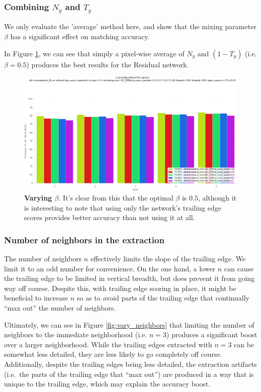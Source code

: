 \subsubsection{Combining $N_y$ and $T_y$}

We only evaluate the 'average' method here, and show that the mixing parameter $\beta$ has a significant effect on matching accuracy.

In Figure \ref{fig:vary_te_weight}, we can see that simply a pixel-wise average of $N_y$ and $(1-T_y)$ (i.e. $\beta = 0.5$) produces the best results for the Residual network.

\begin{figure}[t]%
\centering
\includegraphics[width=1\textwidth]{../images/results/vary_te_weight.png}
\caption{\textbf{Varying $\beta$}. It's clear from this that the optimal $\beta$ is $0.5$, although it is interesting to note that using only the network's trailing edge scores provides better accuracy than not using it at all.}
\label{fig:vary_te_weight}
\end{figure}


\subsubsection{Number of neighbors in the extraction}

The number of neighbors $n$ effectively limits the slope of the trailing edge.
We limit it to an odd number for convenience.
On the one hand, a lower $n$ can cause the trailing edge to be limited in vertical breadth, but does prevent it from going way off course.
Despite this, with trailing edge scoring in place, it might be beneficial to increase $n$ so as to avoid parts of the trailing edge that continually ``max out'' the number of neighbors.

Ultimately, we can see in Figure \ref{fig:vary_neighbors} that limiting the number of neighbors to the immediate neighborhood (i.e. $n = 3$) produces a significant boost over a larger neighborhood.
While the trailing edges extracted with $n = 3$ can be somewhat less detailed, they are less likely to go completely off course.
Additionally, despite the trailing edges being less detailed, the extraction artifacts (i.e.\ the parts of the trailing edge that ``max out'') are produced in a way that is unique to the trailing edge, which may explain the accuracy boost.

